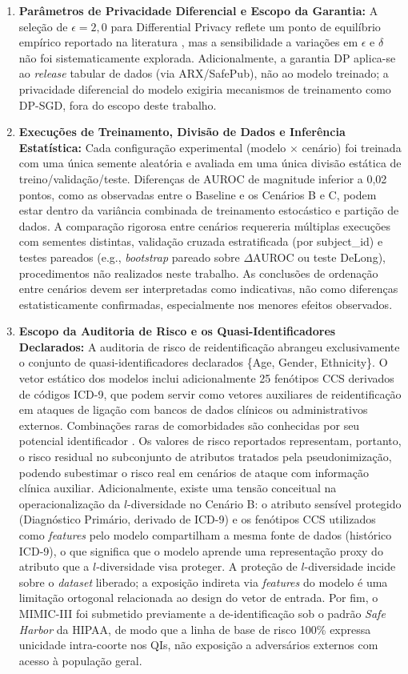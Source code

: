 \begin{enumerate}
    \item \textbf{Parâmetros de Privacidade Diferencial e Escopo da Garantia:} A seleção de $\epsilon=2{,}0$ para Differential Privacy reflete um ponto de equilíbrio empírico reportado na literatura \cite{Pilgram2024}, mas a sensibilidade a variações em $\epsilon$ e $\delta$ não foi sistematicamente explorada. Adicionalmente, a garantia DP aplica-se ao \textit{release} tabular de dados (via ARX/SafePub), não ao modelo treinado; a privacidade diferencial do modelo exigiria mecanismos de treinamento como DP-SGD, fora do escopo deste trabalho.

    \item \textbf{Execuções de Treinamento, Divisão de Dados e Inferência Estatística:} Cada configuração experimental (modelo $\times$ cenário) foi treinada com uma única semente aleatória e avaliada em uma única divisão estática de treino/validação/teste. Diferenças de AUROC de magnitude inferior a 0,02 pontos, como as observadas entre o Baseline e os Cenários B e C, podem estar dentro da variância combinada de treinamento estocástico e partição de dados. A comparação rigorosa entre cenários requereria múltiplas execuções com sementes distintas, validação cruzada estratificada (por subject\_id) e testes pareados (e.g., \textit{bootstrap} pareado sobre $\Delta$AUROC ou teste DeLong), procedimentos não realizados neste trabalho. As conclusões de ordenação entre cenários devem ser interpretadas como indicativas, não como diferenças estatisticamente confirmadas, especialmente nos menores efeitos observados.

    \item \textbf{Escopo da Auditoria de Risco e os Quasi-Identificadores Declarados:} A auditoria de risco de reidentificação abrangeu exclusivamente o conjunto de quasi-identificadores declarados \{Age, Gender, Ethnicity\}. O vetor estático dos modelos inclui adicionalmente 25 fenótipos CCS derivados de códigos ICD-9, que podem servir como vetores auxiliares de reidentificação em ataques de ligação com bancos de dados clínicos ou administrativos externos. Combinações raras de comorbidades são conhecidas por seu potencial identificador \cite{Sweeney2002}. Os valores de risco reportados representam, portanto, o risco residual no subconjunto de atributos tratados pela pseudonimização, podendo subestimar o risco real em cenários de ataque com informação clínica auxiliar. Adicionalmente, existe uma tensão conceitual na operacionalização da $l$-diversidade no Cenário B: o atributo sensível protegido (Diagnóstico Primário, derivado de ICD-9) e os fenótipos CCS utilizados como \textit{features} pelo modelo compartilham a mesma fonte de dados (histórico ICD-9), o que significa que o modelo aprende uma representação proxy do atributo que a $l$-diversidade visa proteger. A proteção de $l$-diversidade incide sobre o \textit{dataset} liberado; a exposição indireta via \textit{features} do modelo é uma limitação ortogonal relacionada ao design do vetor de entrada. Por fim, o MIMIC-III foi submetido previamente a de-identificação sob o padrão \textit{Safe Harbor} da HIPAA, de modo que a linha de base de risco 100\% expressa unicidade intra-coorte nos QIs, não exposição a adversários externos com acesso à população geral.


\end{enumerate}
